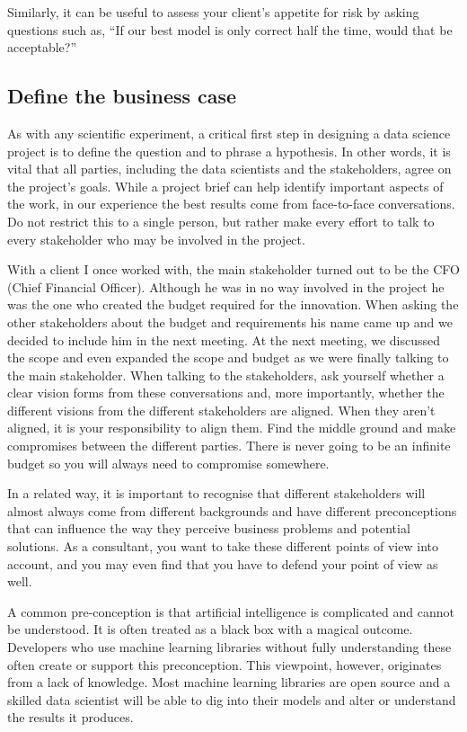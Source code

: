 \documentclass[
]{book}
\begin{document}
Similarly, it can be useful to assess your client's appetite for risk by
asking questions such as, ``If our best model is only correct half the
time, would that be acceptable?''

\hypertarget{define-the-business-case}{%
\subsection{Define the business case}\label{define-the-business-case}}

As with any scientific experiment, a critical first step in designing a
data science project is to define the question and to phrase a
hypothesis. In other words, it is vital that all parties, including the
data scientists and the stakeholders, agree on the project's goals.
While a project brief can help identify important aspects of the work,
in our experience the best results come from face-to-face conversations.
Do not restrict this to a single person, but rather make every effort to
talk to every stakeholder who may be involved in the project.

With a client I once worked with, the main stakeholder turned out to be
the CFO (Chief Financial Officer). Although he was in no way involved in
the project he was the one who created the budget required for the
innovation. When asking the other stakeholders about the budget and
requirements his name came up and we decided to include him in the next
meeting. At the next meeting, we discussed the scope and even expanded
the scope and budget as we were finally talking to the main stakeholder.
When talking to the stakeholders, ask yourself whether a clear vision
forms from these conversations and, more importantly, whether the
different visions from the different stakeholders are aligned. When they
aren't aligned, it is your responsibility to align them. Find the middle
ground and make compromises between the different parties. There is
never going to be an infinite budget so you will always need to
compromise somewhere.

In a related way, it is important to recognise that different
stakeholders will almost always come from different backgrounds and have
different preconceptions that can influence the way they perceive
business problems and potential solutions. As a consultant, you want to
take these different points of view into account, and you may even find
that you have to defend your point of view as well.

A common pre-conception is that artificial intelligence is complicated
and cannot be understood. It is often treated as a black box with a
magical outcome. Developers who use machine learning libraries without
fully understanding these often create or support this preconception.
This viewpoint, however, originates from a lack of knowledge. Most
machine learning libraries are open source and a skilled data scientist
will be able to dig into their models and alter or understand the
results it produces.
\end{document}

